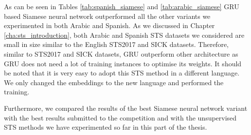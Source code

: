 	\begin{table}[htb]
	\centering
	\caption[Results for Spanish STS with Siamese Neural Network]{Results for Spanish STS dataset with different variants of Siamese Neural Network. For each variant, Pearson Correlation ($\bm{\rho}$) and Spearman Correlation ($\bm{\tau}$) are reported between the predicted values and the gold labels of the test set. Best result from all the variations is marked with ${\dagger}$. }  
	\label{tab:spanish_siamese}
\end{table}


As can be seen in Tables \ref{tab:spanish_siamese} and \ref{tab:arabic_siamese} GRU based Siamese neural network outperformed all the other variants we experimented in both Arabic and Spanish. As we discussed in Chapter \ref{cha:sts_introduction}, both Arabic and Spanish STS datasets we considered are small in size similar to the English STS2017 and SICK datasets. Therefore, similar to STS2017 and SICK datasets, GRU outperform other architecture as GRU does not need a lot of training instances to optimise its weights. It should be noted that it is very easy to adopt this STS method in a different language. We only changed the embeddings to the new language and performed the training. 

Furthermore, we compared the results of the best Siamese neural network variant with the best results submitted to the competition \cite{cer-etal-2017-semeval} and with the unsupervised STS methods we have experimented so far in this part of the thesis. 


